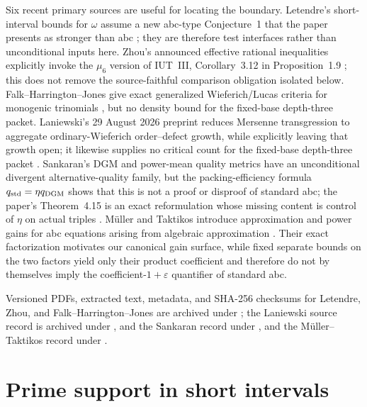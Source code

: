 \documentclass[11pt]{amsart}
\theoremstyle{definition}
\theoremstyle{remark}
\begin{document}
Six recent primary sources are useful for locating the boundary.  Letendre's
short-interval bounds for $\omega$ assume a new abc-type Conjecture~1 that the
paper presents as stronger than abc \cite{Letendre2026ABCRevisited}; they are
therefore test interfaces rather than unconditional inputs here.  Zhou's
announced effective rational inequalities explicitly invoke the $\mu_6$
version of IUT~III, Corollary~3.12 in Proposition~1.9
\cite{Zhou2025IUTRationals}; this does not remove the source-faithful comparison
obligation isolated below.  Falk--Harrington--Jones give exact generalized
Wieferich/Lucas criteria for monogenic trinomials
\cite{FalkHarringtonJones2026}, but no density bound for the fixed-base
depth-three packet.  Laniewski's 29 August 2026 preprint reduces Mersenne
transgression to aggregate ordinary-Wieferich order--defect growth, while
explicitly leaving that growth open; it likewise supplies no critical count
for the fixed-base depth-three packet \cite{Laniewski2026RadicalDefects}.
Sankaran's DGM and power-mean quality metrics have an unconditional divergent
alternative-quality family, but the packing-efficiency formula
$q_{\rm std}=\eta q_{\rm DGM}$ shows that this is not a proof or disproof of
standard abc; the paper's Theorem~4.15 is an exact reformulation whose missing
content is control of $\eta$ on actual triples
\cite{Sankaran2026AlternativeQuality}.
M\"uller and Taktikos introduce approximation and power gains for abc
equations arising from algebraic approximation \cite{MuellerTaktikos2026}.
Their exact factorization motivates our canonical gain surface, while fixed
separate bounds on the two factors yield only their product coefficient and
therefore do not by themselves imply the coefficient-$1+\varepsilon$
quantifier of standard abc.
{\raggedright
Versioned PDFs, extracted text, metadata, and SHA-256 checksums for Letendre,
Zhou, and Falk--Harrington--Jones are archived under
; the Laniewski
source record is archived under
, and
the Sankaran record under
, and the
M\"uller--Taktikos record under
.
\par}

\section{Prime support in short intervals}\label{sec:smooth}
\end{document}
